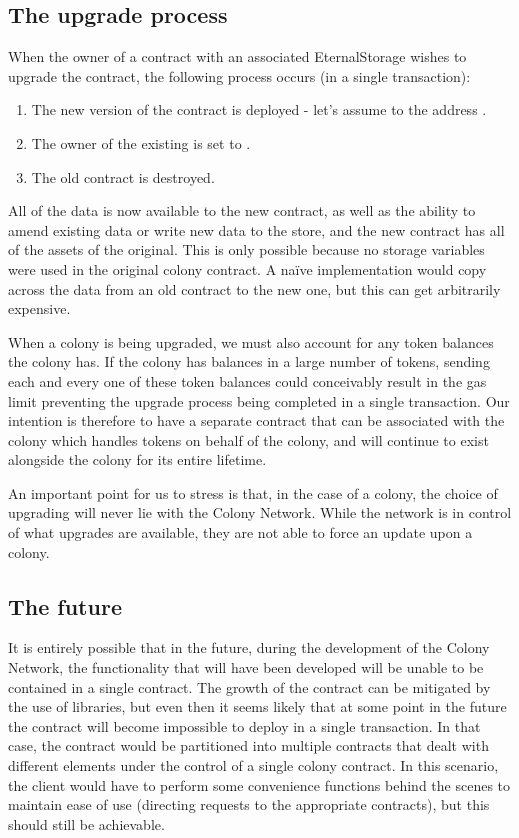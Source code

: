 \subsection{The upgrade process}

When the owner of a contract with an associated EternalStorage wishes to upgrade the contract, the following process occurs (in a single transaction):

\begin{enumerate}
\item The new version of the contract is deployed - let's assume to the address .
\item The owner of the existing  is set to .
\item The old contract is destroyed.
\end{enumerate}

All of the data is now available to the new contract, as well as the ability to amend existing data or write new data to the store, and the new contract has all of the assets of the original. This is only possible because no storage variables were used in the original colony contract. A na{\"i}ve implementation would copy across the data from an old contract to the new one, but this can get arbitrarily expensive.

When a colony is being upgraded, we must also account for any token balances the colony has. If the colony has balances in a large number of tokens, sending each and every one of these token balances could conceivably result in the gas limit preventing the upgrade process being completed in a single transaction. Our intention is therefore to have a separate contract that can be associated with the colony which handles tokens on behalf of the colony, and will continue to exist alongside the colony for its entire lifetime.

An important point for us to stress is that, in the case of a colony, the choice of upgrading will never lie with the Colony Network. While the network is in control of what upgrades are available, they are not able to force an update upon a colony.

\subsection{The future}
It is entirely possible that in the future, during the development of the Colony Network, the functionality that will have been developed will be unable to be contained in a single  contract. The growth of the contract can be mitigated by the use of libraries, but even then it seems likely that at some point in the future the contract will become impossible to deploy in a single transaction. In that case, the contract would be partitioned into multiple contracts that dealt with different elements under the control of a single colony contract. In this scenario, the client would have to perform some convenience functions behind the scenes to maintain ease of use (directing requests to the appropriate contracts), but this should still be achievable.